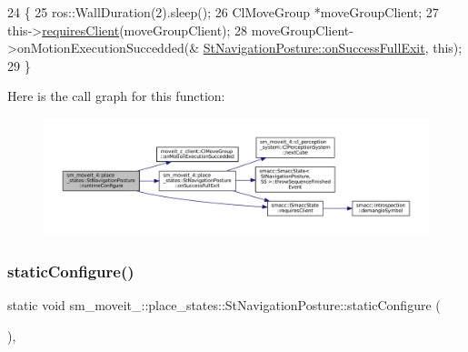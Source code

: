 \begin{DoxyCode}
24             \{
25                 ros::WallDuration(2).sleep();
26                 ClMoveGroup *moveGroupClient;
27                 this->\hyperlink{classsmacc_1_1ISmaccState_a7f95c9f0a6ea2d6f18d1aec0519de4ac}{requiresClient}(moveGroupClient);
28                 moveGroupClient->onMotionExecutionSuccedded(&
      \hyperlink{structsm__moveit__4_1_1place__states_1_1StNavigationPosture_a95ab74dae51538aeae46f71b515bc61e}{StNavigationPosture::onSuccessFullExit}, \textcolor{keyword}{this});
29             \}
\end{DoxyCode}
Here is the call graph for this function\+:
\nopagebreak
\begin{figure}[H]
\begin{center}
\leavevmode
\includegraphics[width=350pt]{structsm__moveit__4_1_1place__states_1_1StNavigationPosture_aaf8ca02fa5a8185baf6bfc55731b1926_cgraph}
\end{center}
\end{figure}
\mbox{\label{structsm__moveit__4_1_1place__states_1_1StNavigationPosture_a29ac0c6cd858bb59ca3bc103da13b0a0}} 
\subsubsection{\texorpdfstring{static\+Configure()}{staticConfigure()}}
{\footnotesize\ttfamily static void sm\+\_\+moveit\+\_\+::place\+\_\+states\+::\+St\+Navigation\+Posture\+::static\+Configure (\begin{DoxyParamCaption}{ }\end{DoxyParamCaption})\hspace{0.3cm}{\ttfamily [inline]}, {\ttfamily [static]}}



